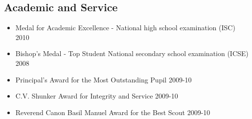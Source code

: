 \documentclass[11pt,a4paper]{moderncv}
\begin{document}
\subsection{Academic and Service}
\begin{itemize}
\item Medal for Academic Excellence - National high school examination (ISC) \hfill 2010
\item Bishop's Medal - Top Student National secondary school examination (ICSE) \hfill 2008
\item Principal's Award for the Most Outstanding Pupil \hfill 2009-10
\item C.V. Shunker Award for Integrity and Service \hfill 2009-10
\item Reverend Canon Basil Manuel Award for the Best Scout \hfill 2009-10
\end{itemize}
\begin{comment}
\subsection{Boy Scouts}
\item Best Scout Camper in Annual Scouts and Cubs Winter Camp \hfill 2006
\item Winner of Annual Hechle Ambulance Shield First Aid Competition \hfill 2008
\item First Runner Up of Annual Scouts and Guides Quiz Competition \hfill 2007
\end{comment}
\begin{comment}
\begin{itemize}
\item School Captain and President of Student's Council \hfill 2009-2010
\item Troop Leader of Boy Scouts Association \hfill 2008-2010
\item Nature Club President \hfill 2009-2010
\item President of inter-school cultural fest Jaco Sanskriti\hfill 2009
\item Vice President of inter-school quiz competition Jaco-Iz\hfill 2009
\end{itemize}
\end{comment}
\end{document}
